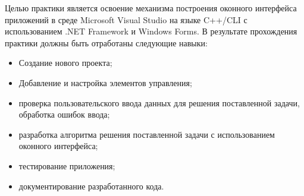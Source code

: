 \intro 

Целью практики является освоение механизма построения оконного интерфейса приложений в среде Microsoft Visual Studio на языке C++/CLI с использованием .NET Framework и Windows Forms. В результате прохождения практики должны быть отработаны следующие навыки:
\begin{itemize}
    \item Создание нового проекта;
    \item Добавление и настройка элементов управления;
    \item проверка пользовательского ввода данных для решения поставленной задачи, обработка ошибок ввода;
    \item разработка алгоритма решения поставленной задачи с использованием оконного интерфейса;
    \item тестирование приложения;
    \item документирование разработанного кода.
\end{itemize}